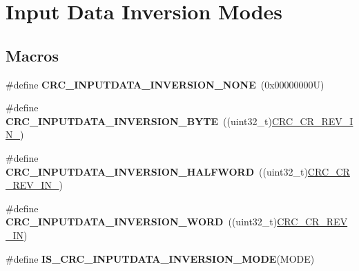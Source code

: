 \hypertarget{group___c_r_c_ex___input___data___inversion}{}\section{Input Data Inversion Modes}
\label{group___c_r_c_ex___input___data___inversion}
\subsection*{Macros}
\begin{DoxyCompactItemize}
\item 
\mbox{\label{group___c_r_c_ex___input___data___inversion_gaef0c058a5f7441857e6be133907054cc}} 
\#define {\bfseries C\+R\+C\+\_\+\+I\+N\+P\+U\+T\+D\+A\+T\+A\+\_\+\+I\+N\+V\+E\+R\+S\+I\+O\+N\+\_\+\+N\+O\+NE}~(0x00000000\+U)
\item 
\mbox{\label{group___c_r_c_ex___input___data___inversion_ga084b67040f6451515ecda8f9c58be186}} 
\#define {\bfseries C\+R\+C\+\_\+\+I\+N\+P\+U\+T\+D\+A\+T\+A\+\_\+\+I\+N\+V\+E\+R\+S\+I\+O\+N\+\_\+\+B\+Y\+TE}~((uint32\+\_\+t)\hyperlink{group___peripheral___registers___bits___definition_ga92fda6ff4d3290ee41e59a13e2e8037b}{C\+R\+C\+\_\+\+C\+R\+\_\+\+R\+E\+V\+\_\+\+I\+N\+\_})
\item 
\mbox{\label{group___c_r_c_ex___input___data___inversion_ga167d77d863bf663b3ff41da62b047b55}} 
\#define {\bfseries C\+R\+C\+\_\+\+I\+N\+P\+U\+T\+D\+A\+T\+A\+\_\+\+I\+N\+V\+E\+R\+S\+I\+O\+N\+\_\+\+H\+A\+L\+F\+W\+O\+RD}~((uint32\+\_\+t)\hyperlink{group___peripheral___registers___bits___definition_ga3ffd71a81205713ba49123a7c4e7a7ef}{C\+R\+C\+\_\+\+C\+R\+\_\+\+R\+E\+V\+\_\+\+I\+N\+\_})
\item 
\mbox{\label{group___c_r_c_ex___input___data___inversion_gaf38ebb4f56cc12653d96ce27cdf84848}} 
\#define {\bfseries C\+R\+C\+\_\+\+I\+N\+P\+U\+T\+D\+A\+T\+A\+\_\+\+I\+N\+V\+E\+R\+S\+I\+O\+N\+\_\+\+W\+O\+RD}~((uint32\+\_\+t)\hyperlink{group___peripheral___registers___bits___definition_ga4c5a6e8ab7464ff35f1e5f424b76c15a}{C\+R\+C\+\_\+\+C\+R\+\_\+\+R\+E\+V\+\_\+\+IN})
\item 
\#define {\bfseries I\+S\+\_\+\+C\+R\+C\+\_\+\+I\+N\+P\+U\+T\+D\+A\+T\+A\+\_\+\+I\+N\+V\+E\+R\+S\+I\+O\+N\+\_\+\+M\+O\+DE}(M\+O\+DE)
\end{DoxyCompactItemize}


